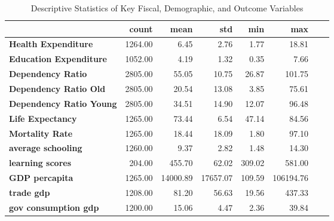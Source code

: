 \begin{table}
\caption{Descriptive Statistics of Key Fiscal, Demographic, and Outcome Variables}
\label{tab:descstats}
\begin{tabular}{lrrrrrrr}
\toprule
 & count & mean & std & min & max \\
\midrule
\textbf{Health Expenditure} & 1264.00 & 6.45 & 2.76 & 1.77 & 18.81 \\
\textbf{Education Expenditure} & 1052.00 & 4.19 & 1.32 & 0.35 & 7.66 \\
\textbf{Dependency Ratio} & 2805.00 & 55.05 & 10.75 & 26.87 & 101.75 \\
\textbf{Dependency Ratio Old} & 2805.00 & 20.54 & 13.08 & 3.85 & 75.61 \\
\textbf{Dependency Ratio Young} & 2805.00 & 34.51 & 14.90 & 12.07 & 96.48 \\
\textbf{Life Expectancy} & 1265.00 & 73.44 & 6.54 & 47.14 & 84.56 \\
\textbf{Mortality Rate} & 1265.00 & 18.44 & 18.09 & 1.80 & 97.10 \\
\textbf{average schooling} & 1260.00 & 9.37 & 2.82 & 1.48 & 14.30 \\
\textbf{learning scores} & 204.00 & 455.70 & 62.02 & 309.02 & 581.00 \\
\textbf{GDP percapita} & 1265.00 & 14000.89 & 17657.07 & 109.59 & 106194.76 \\
\textbf{trade gdp} & 1208.00 & 81.20 & 56.63 & 19.56 & 437.33 \\
\textbf{gov consumption gdp} & 1200.00 & 15.06 & 4.47 & 2.36 & 39.84 \\
\bottomrule
\end{tabular}
\end{table}
